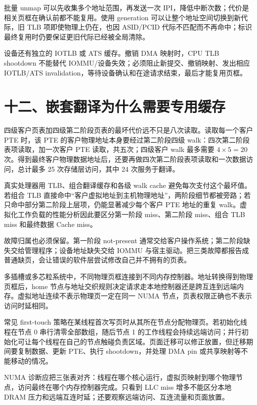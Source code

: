 批量 unmap 可以先收集多个地址范围，再发送一次 IPI，降低中断次数；代价是相关页框在确认前都不能复用。使用 generation 可以让整个地址空间切换到新代际，旧 TLB 项即使物理上仍在，也因 ASID/PCID 代际不匹配而不再命中；标识最终复用时仍要保证更旧代际已经被全局清除。

设备还有独立的 IOTLB 或 ATS 缓存。撤销 DMA 映射时，CPU TLB shootdown 不能替代 IOMMU/设备失效；必须阻止新提交、撤销映射、发出相应 IOTLB/ATS invalidation，等待设备确认和在途请求结束，最后才能复用页框。

\section{十二、嵌套翻译为什么需要专用缓存}

四级客户页表加四级第二阶段页表的最坏代价远不只是八次读取。读取每一个客户 PTE 时，该 PTE 的客户物理地址本身要经过第二阶段四级 walk：四次第二阶段表项读取，加一次客户 PTE 读取，共五次；四级客户 walk 最多需要 $4\times5=20$ 次。得到最终客户物理数据地址后，还要再做四次第二阶段表项读取和一次数据访问，总计最多 25 次存储层访问，其中 24 次服务于翻译。

真实处理器用 TLB、组合翻译缓存和各级 walk cache 避免每次支付这个最坏值。若组合 TLB 直接命中“客户虚拟地址到主机物理地址”，两阶段细节都被旁路；若只命中部分第二阶段上层项，仍能显著减少每个客户 PTE 地址的重复 walk。虚拟化工作负载的性能分析因此要区分第一阶段 miss、第二阶段 miss、组合 TLB miss 和最终数据 Cache miss。

故障归属也必须保留。第一阶段 not-present 通常交给客户操作系统；第二阶段缺失交给管理程序；设备地址缺失交给 IOMMU 与宿主驱动。把三类故障都报告成普通缺页，会让错误的软件层尝试修改自己并不拥有的页表。


多插槽或多芯粒系统中，不同物理页框连接到不同内存控制器。地址转换得到物理页框后，home 节点与地址交织规则决定请求走本地控制器还是跨互连到远端内存。虚拟地址连续不表示物理页一定在同一 NUMA 节点，页表权限正确也不表示访问时延相同。

常见 first-touch 策略在某线程首次写页时从其所在节点分配物理页。若初始化线程在节点 0 串行清零全部数组，随后节点 1 的工作线程会持续远端访问；并行初始化可让每个线程在自己的节点触碰负责区域。页面迁移可以修正放置，但迁移期间要复制数据、更新 PTE、执行 shootdown，并处理 DMA pin 或共享映射等不能移动的情况。

NUMA 诊断应把三张表对齐：线程在哪个核心运行，虚拟页映射到哪个物理节点，访问最终在哪个内存控制器完成。只看到 LLC miss 增多不能区分本地 DRAM 压力和远端互连时延；还要观察远端访问、互连流量和页面放置。
































